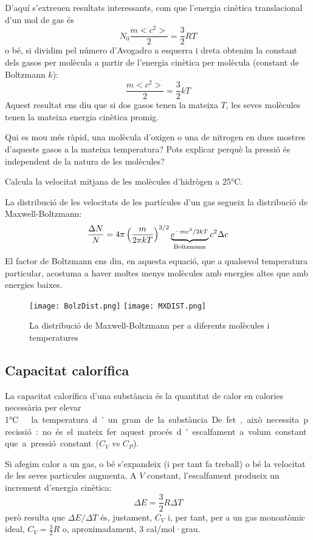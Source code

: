 D'aquí s'extreuen resultats interessants, com que l'energia cinètica translacional d'un mol de gas és \[N_0 \frac{m <c^2>}{2}=\frac{3}{2} RT\] o bé, si dividim pel número d'Avogadro a esquerra i dreta obtenim la constant dels gasos per molècula a partir de l'energia cinètica per molècula (constant de Boltzmann $k$): 
\[\frac{m <c^2>}{2}=\frac{3}{2} kT\]
Aquest resultat ens diu que si dos gasos tenen la mateixa $T$, les seves molècules tenen la mateixa energia cinètica promig. 

\begin{exr}
Qui es mou més ràpid, una molècula d'oxigen o una de nitrogen en dues mostres d'aquests gasos a la mateixa temperatura? Pots explicar perquè la pressió és independent de la natura de les molècules?
\end{exr}

\begin{exr}
Calcula la velocitat mitjana de les molècules d'hidrògen a 25\si\degreeCelsius.
\end{exr}

La distribució de les velocitats de les partícules d'un gas segueix la distribució de Maxwell-Boltzmann\cite{mahan_quimica_1997}:
\[
\frac{\Delta N}{N}=4 \pi \left( \frac{m}{2 \pi kT}\right)^{3/2} \underbrace{e^{-mc^2/2kT}}_{\rm Boltzmann} c^2 \Delta c
\]
El factor de Boltzmann ens diu, en aquesta equació, que a qualsevol temperatura particular, acostuma a haver moltes menys molècules amb energies altes que amb energies baixes.
\begin{figure}[h]
\centering
\texttt{[image: BolzDist.png]}
\texttt{[image: MXDIST.png]}
\caption{La distribució de Maxwell-Boltzmann per a diferents molècules i temperatures}
\label{fig:Maxwell}
\end{figure}






\subsection{Capacitat calorífica}

La capacitat calorífica d'una substància és la quantitat de calor en calories necessària per elevar 1\si\degreeCelsius\ la temperatura d'un gram de la substància.

De fet, això necessita precissió: no és el mateix fer aquest procés d'escalfament a volum constant que a pressió constant ($C_V$ vs $C_P$).

Si afegim calor a un gas, o bé s'expandeix (i per tant fa treball) o bé la velocitat de les seves particules augmenta.
A $V$ constant, l'escalfament produeix un increment d'energia cinètica:
\[\Delta E = \frac{3}{2} R \Delta T\]
però resulta que $\Delta E/ \Delta T$ és, justament, $C_V$ i, per tant, per a un gas monoatòmic ideal, $C_V=\frac{3}{2}R$ o, aproximadament, 3 cal/mol·grau.

